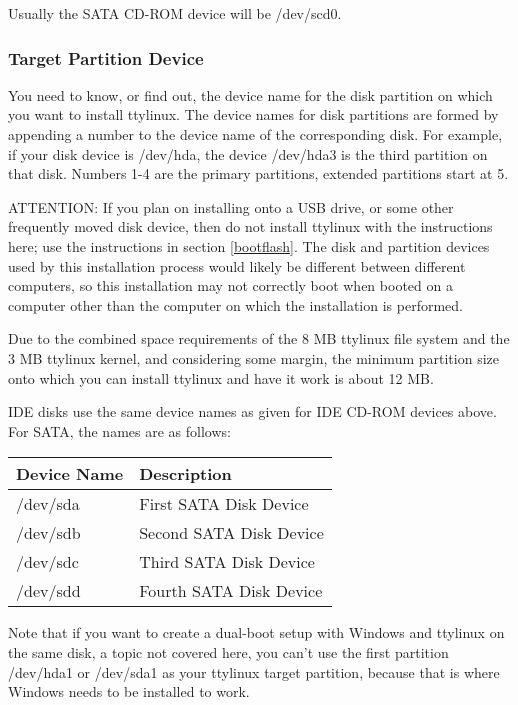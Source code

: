 \documentclass[10pt]{article}
\begin{document}
Usually the SATA CD-ROM device will be /dev/scd0.

\subsubsection{Target Partition Device}
\label{targetpartition}

You need to know, or find out, the device name for the disk partition on which
you want to install ttylinux. The device names for disk partitions are formed
by appending a number to the device name of the corresponding disk. For
example, if your disk device is /dev/hda, the device /dev/hda3 is the third
partition on that disk. Numbers 1-4 are the primary partitions, extended
partitions start at 5.

ATTENTION: If you plan on installing onto a USB drive, or some other frequently
moved disk device, then do not install ttylinux with the instructions here; use
the instructions in section \ref{bootflash}. The disk and partition devices
used by this installation process would likely be different between different
computers, so this installation may not correctly boot when booted on a
computer other than the computer on which the installation is performed.

Due to the combined space requirements of the 8 MB ttylinux file system and the
3 MB ttylinux kernel, and considering some margin, the minimum partition size
onto which you can install ttylinux and have it work is about 12 MB.

IDE disks use the same device names as given for IDE CD-ROM devices above. For
SATA, the names are as follows:

\begin{center}
\begin{tabular}{l|l}
Device Name & Description \\
\hline
/dev/sda & First SATA Disk Device  \\
/dev/sdb & Second SATA Disk Device \\
/dev/sdc & Third SATA Disk Device  \\
/dev/sdd & Fourth SATA Disk Device \\
\end{tabular}
\end{center}

Note that if you want to create a dual-boot setup with Windows and ttylinux on
the same disk, a topic not covered here, you can't use the first partition
/dev/hda1 or /dev/sda1 as your ttylinux target partition, because that is where
Windows needs to be installed to work.
\end{document}
